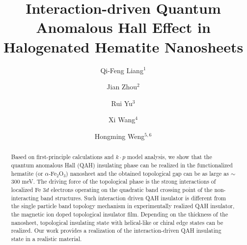 \documentclass[twocolumn,english,prb,showpacs]{revtex4-1}
\begin{document}
\title{{Interaction-driven Quantum Anomalous Hall Effect in Halogenated Hematite Nanosheets}}


\author{Qi-Feng Liang$^{1}$} \author{Jian Zhou$^{2}$} \author{Rui Yu$^{3}$} \author{Xi Wang$^{4}$} \author{Hongming Weng$^{5, 6}$}
\address{$^{1}$ Department of Physics, Shaoxing University, Shaoxing 312000, P. R. China}
\address{$^{2}$ National Laboratory of Solid State Microstructures and Department of Materials Science and Engineering, Nanjing University, Nanjing 210093, China}
\address{$^{3}$ School of Physics and Technology, Wuhan University, Wuhan 430072, P. R. China}
\address{$^{4}$ School of Sciences, Beijing Jiaotong University, Beijing 100044, P. R. China}
\address{$^{5}$ Beijing National Laboratory for Condensed Matter Physics, and Institute of Physics, Chinese Academy of Sciences,Beijing 100190,  P. R. China}
\address{$^{6}$ Collaborative Innovation Center of Quantum Matter, Beijing, China}


\begin{abstract}
Based on first-principle calculations and $k\cdot p$ model analysis, we show that the quantum anomalous Hall (QAH) insulating phase can be realized in the functionalized hematite (or $\alpha$-Fe$_2$O$_3$) nanosheet and the obtained topological gap can be as large as $\sim$300 meV. The driving force of the topological phase is the strong interactions of localized Fe 3$d$ electrons operating on the quadratic band crossing point of the non-interacting band structures. {Such interaction driven QAH insulator is different from the single particle band topology mechanism in experimentally realized QAH insulator, the magnetic ion doped topological insulator film.} Depending on the thickness of the nanosheet, topological insulating state with helical-like or chiral edge states can be realized. Our work provides a realization of the interaction-driven QAH insulating state in a realistic material.
\end{abstract}
\maketitle
\end{document}
